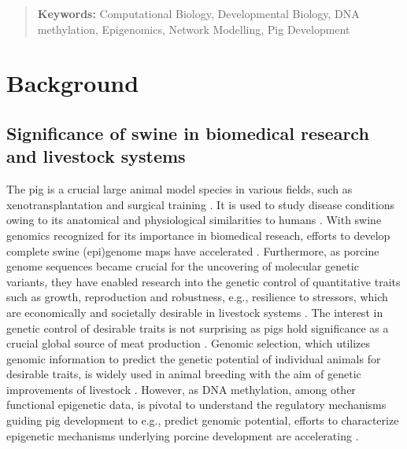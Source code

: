 \documentclass[
	a4paper, %
	10pt, %
	unnumberedsections, %
	twoside, %
]{LTJournalArticle}
\begin{document}
\begin{abstract}
		  \noindent \normalfont \textbf{Keywords: }Computational Biology, Developmental Biology,
		  DNA methylation, Epigenomics, Network Modelling, Pig Development

\end{abstract}
\twocolumn %

\section{\large Background}
\subsection{\normalsize Significance of swine in biomedical research and livestock systems}
The pig is a crucial large animal model species in various fields, such as 
xenotransplantation and surgical training \autocite{swindle2012a}. It is 
used to study disease conditions owing to its anatomical and physiological 
similarities to humans \autocite{helke2015a}. With swine genomics recognized 
for its importance in biomedical reseach,
efforts to develop complete swine (epi)genome maps have accelerated 
\autocite{gutierrez2015a, prather2013a}. Furthermore, as porcine genome sequences 
became crucial for the uncovering of molecular genetic variants, they have enabled 
research into the genetic control of quantitative traits such as growth, reproduction
and robustness, e.g., resilience to stressors, which are economically and societally 
desirable in livestock systems \autocite{warr2020a, lenoir2022a}.
The interest in genetic control of desirable traits is not surprising as pigs 
hold significance as a crucial global source of meat production \autocite{mcglone2013a}. 
Genomic selection, which utilizes genomic information to predict the genetic potential 
of individual animals for desirable traits, is widely used in animal breeding with 
the aim of genetic improvements of livestock \autocite{werf2013a, johnsson2023a}. 
However, as DNA methylation, among other functional epigenetic data, is pivotal to 
understand the regulatory mechanisms guiding pig development to e.g., predict 
genomic potential, efforts to characterize epigenetic mechanisms underlying porcine 
development are accelerating \autocite{triantaphyllopoulos2016a}.
\end{document}
